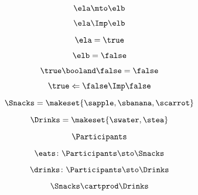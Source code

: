 \begin{forslides}
    \begin{equation}
        \label{eq:feedback-033}
        \ela \mto \elb
    \end{equation}

    \begin{equation}
        \label{eq:feedback-034}
        \ela \Imp \elb
    \end{equation}

    \begin{equation}
        \label{eq:feedback-035}
        \ela = \true
    \end{equation}

    \begin{equation}
        \label{eq:feedback-036}
        \elb= \false
    \end{equation}

    \begin{equation}
        \label{eq:feedback-037}
        \true \booland \false = \false
    \end{equation}

    \begin{equation}
        \label{eq:feedback-038}
        \true \Leftarrow \false \Imp \false
    \end{equation}

    \begin{equation}
        \label{eq:feedback-039}
        \Snacks=\makeset{\sapple,\sbanana,\scarrot}
    \end{equation}

    \begin{equation}
        \label{eq:feedback-040}
        \Drinks=\makeset{\swater,\stea}
    \end{equation}

    \begin{equation}
        \label{eq:feedback-041}
        \Participants
    \end{equation}

    \begin{equation}
        \label{eq:feedback-042}
        \eats \colon \Participants \sto \Snacks
    \end{equation}

    \begin{equation}
        \label{eq:feedback-043}
        \drinks \colon  \Participants \sto \Drinks
    \end{equation}

    \begin{equation}
        \label{eq:feedback-044}
        \Snacks\cartprod \Drinks
    \end{equation}


\end{forslides}
